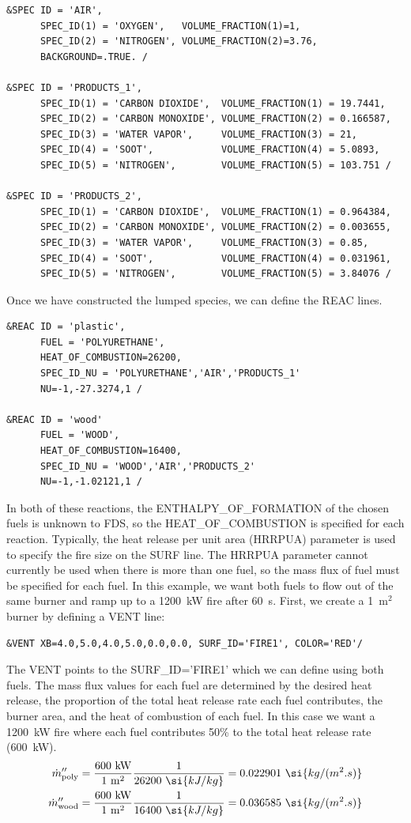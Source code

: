 \documentclass[11pt]{book}
\begin{document}
\begin{lstlisting}
&SPEC ID = 'AIR',
      SPEC_ID(1) = 'OXYGEN',   VOLUME_FRACTION(1)=1,
      SPEC_ID(2) = 'NITROGEN', VOLUME_FRACTION(2)=3.76,
      BACKGROUND=.TRUE. /

&SPEC ID = 'PRODUCTS_1',
      SPEC_ID(1) = 'CARBON DIOXIDE',  VOLUME_FRACTION(1) = 19.7441,
      SPEC_ID(2) = 'CARBON MONOXIDE', VOLUME_FRACTION(2) = 0.166587,
      SPEC_ID(3) = 'WATER VAPOR',     VOLUME_FRACTION(3) = 21,
      SPEC_ID(4) = 'SOOT',            VOLUME_FRACTION(4) = 5.0893,
      SPEC_ID(5) = 'NITROGEN',        VOLUME_FRACTION(5) = 103.751 /

&SPEC ID = 'PRODUCTS_2',
      SPEC_ID(1) = 'CARBON DIOXIDE',  VOLUME_FRACTION(1) = 0.964384,
      SPEC_ID(2) = 'CARBON MONOXIDE', VOLUME_FRACTION(2) = 0.003655,
      SPEC_ID(3) = 'WATER VAPOR',     VOLUME_FRACTION(3) = 0.85,
      SPEC_ID(4) = 'SOOT',            VOLUME_FRACTION(4) = 0.031961,
      SPEC_ID(5) = 'NITROGEN',        VOLUME_FRACTION(5) = 3.84076 /
\end{lstlisting}
Once we have constructed the lumped species, we can define the {\ct REAC} lines.
\begin{lstlisting}
&REAC ID = 'plastic',
      FUEL = 'POLYURETHANE',
      HEAT_OF_COMBUSTION=26200,
      SPEC_ID_NU = 'POLYURETHANE','AIR','PRODUCTS_1'
      NU=-1,-27.3274,1 /

&REAC ID = 'wood'
      FUEL = 'WOOD',
      HEAT_OF_COMBUSTION=16400,
      SPEC_ID_NU = 'WOOD','AIR','PRODUCTS_2'
      NU=-1,-1.02121,1 /
\end{lstlisting}
In both of these reactions, the {\ct ENTHALPY\_OF\_FORMATION} of the chosen fuels is unknown to FDS, so the {\ct HEAT\_OF\_COMBUSTION} is specified for each reaction. Typically, the heat release per unit area ({\ct HRRPUA}) parameter is used to specify the fire size on the {\ct SURF} line. The {\ct HRRPUA} parameter cannot currently be used when there is more than one fuel, so the mass flux of fuel must be specified for each fuel. In this example, we want both fuels to flow out of the same burner and ramp up to a 1200~kW fire after 60~s. First, we create a 1~m$^2$ burner by defining a {\ct VENT} line:
\begin{lstlisting}
&VENT XB=4.0,5.0,4.0,5.0,0.0,0.0, SURF_ID='FIRE1', COLOR='RED'/
\end{lstlisting}
The {\ct VENT} points to the {\ct SURF\_ID='FIRE1'} which we can define using both fuels. The mass flux values for each fuel are determined by the desired heat release, the proportion of the total heat release rate each fuel contributes, the burner area, and the heat of combustion of each fuel. In this case we want a 1200~kW fire where each fuel contributes 50\% to the total heat release rate (600~kW).
\begin{align}
\dot{m}''_{\rm poly} &= \frac{600~\mathrm{kW}}{1~\mathrm{m^2}}\frac{1}{26200~\si{kJ/kg}} = 0.022901~\si{kg/(m^2.s)}\\
\dot{m}''_{\rm wood} &= \frac{600~\mathrm{kW}}{1~\mathrm{m^2}}\frac{1}{16400~\si{kJ/kg}} = 0.036585~\si{kg/(m^2.s)}
\end{align}
\end{document}
